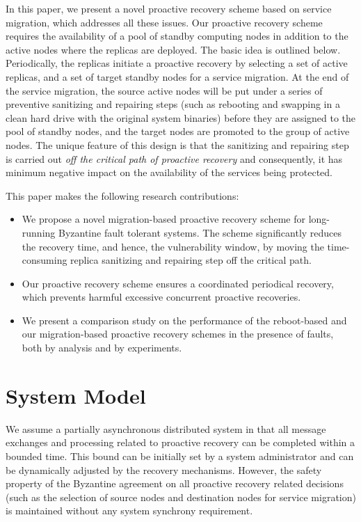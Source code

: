 \documentclass[times, 10pt, twocolumn]{article}
\begin{document}
In this paper, we present a novel proactive recovery scheme based
on service migration, which addresses all these issues. 
Our proactive recovery scheme requires the availability
of a pool of standby computing nodes in addition to the active nodes 
where the replicas are deployed. The basic idea is outlined below.
Periodically, the replicas initiate a proactive recovery by selecting a 
set of active replicas, and a set of target standby nodes for a
service migration. At the end of the service migration, the source
active nodes will be put under a series of preventive sanitizing and repairing
steps (such as rebooting and swapping in a clean hard drive with the 
original system binaries) before they are assigned to the pool of 
standby nodes, and the target nodes are promoted to the group of active 
nodes. The unique feature of this design is that the sanitizing and 
repairing step is carried out {\em off the critical path of proactive 
recovery} and consequently, it has minimum negative impact on the 
availability of the services being protected.

This paper makes the following research contributions: 
\begin{itemize}
\item We propose a novel migration-based proactive recovery scheme for 
long-running Byzantine fault tolerant systems. The scheme significantly reduces
the recovery time, and hence, the vulnerability window, by moving the
time-consuming replica sanitizing and repairing step off the critical path.

\item Our proactive recovery scheme ensures a coordinated periodical
recovery, which prevents harmful excessive concurrent proactive recoveries.

\item We present a comparison study on the performance of the reboot-based 
and our migration-based proactive recovery schemes in the presence
of faults, both by analysis and by experiments.

\end{itemize}

\section{System Model}

We assume a partially asynchronous distributed system in that all
message exchanges and processing related to proactive recovery can
be completed within a bounded time. This bound can be initially set
by a system administrator and can be dynamically adjusted by the
recovery mechanisms. However, the safety property of the Byzantine 
agreement on all proactive recovery related decisions (such as
the selection of source nodes and destination nodes for service
migration) is maintained without any system synchrony requirement.
\end{document}
